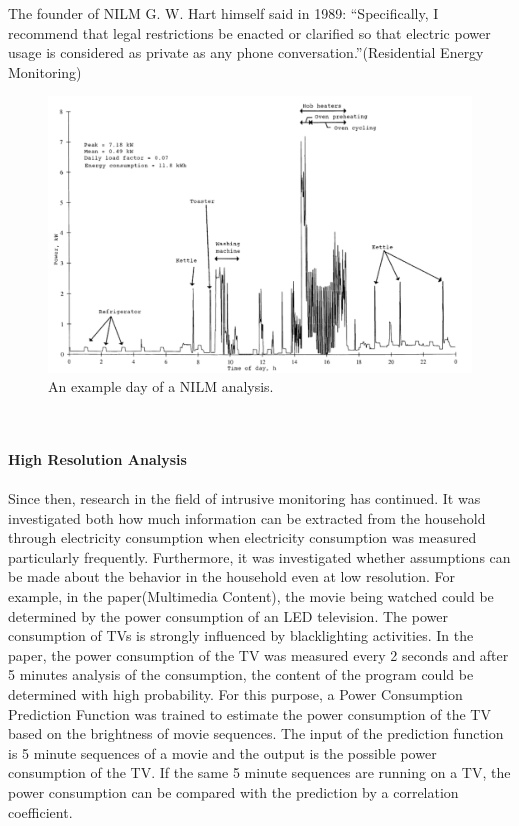 The founder of NILM G. W. Hart himself said in 1989: ``Specifically, I recommend that legal restrictions be enacted or clarified so that electric power usage is considered as private as any phone conversation.''(Residential Energy Monitoring)\begin{figure}[tbp]
  \centering
  \includegraphics[width=1\textwidth]{images/nilm.png}
  \caption[Short description]{An example day of a NILM analysis.}
  \label{fig:Nilm}
\end{figure}
\\
\\
\textbf{High Resolution Analysis}
\\
\\
Since then, research in the field of intrusive monitoring has continued. It was investigated both how much information can be extracted from the household through electricity consumption when electricity consumption was measured particularly frequently. Furthermore, it was investigated whether assumptions can be made about the behavior in the household even at low resolution.
For example, in the paper(Multimedia Content), the movie being watched could be determined by the power consumption of an LED television. The power consumption of TVs is strongly influenced by blacklighting activities.
In the paper, the power consumption of the TV was measured every 2 seconds and after 5 minutes analysis of the consumption, the content of the program could be determined with high probability. For this purpose, a Power Consumption Prediction Function was trained to estimate the power consumption of the TV based on the brightness of movie sequences. The input of the prediction function is 5 minute sequences of a movie and the output is the possible power consumption of the TV. If the same 5 minute sequences are running on a TV, the power consumption can be compared with the prediction by a correlation coefficient.
